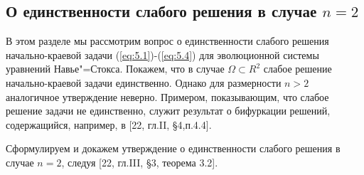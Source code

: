 \subsection {О единственности слабого решения в случае $n = 2$}
В этом разделе мы рассмотрим вопрос о единственности слабого решения начально-краевой задачи (\ref{eq:5.1})-(\ref{eq:5.4}) для эволюционной
системы уравнений Навье"=Стокса. Покажем, что в случае $\Omega \subset R^2$ слабое решение начально-краевой задачи единственно.
Однако для размерности $n > 2$ аналогичное утверждение неверно. Примером, показывающим, что слабое решение задачи не единственно, служит результат
о бифуркации решений, содержащийся, например, в [22, гл.II, \S 4,п.4.4].

Сформулируем и докажем утверждение о единственности слабого решения в случае $n = 2$, следуя [22, гл.III, \S 3, теорема 3.2].

